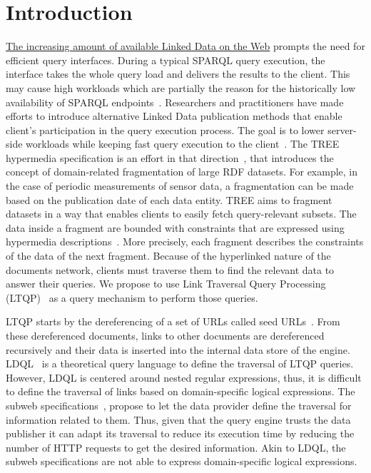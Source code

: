 \section{Introduction}



\href{https://lod-cloud.net/#diagram}{The increasing amount of available Linked Data on the Web} prompts the need for efficient query interfaces.
During a typical SPARQL query execution, the interface takes the whole query load and delivers the results to the client.
This may cause high workloads which are partially the reason for the historically low availability of SPARQL endpoints~\cite{aranda2013}.
Researchers and practitioners have made efforts to introduce alternative Linked Data publication methods that enable client's participation in the query execution process.
The goal is to lower server-side workloads while keeping fast query execution to the client~\cite{Azzam2021}.
The TREE hypermedia specification is an effort in that direction~\cite{ColpaertMaterializedTREE, lancker2021LDS}, that introduces the concept of domain-related fragmentation of large RDF datasets.
For example, in the case of periodic measurements of sensor data, a fragmentation can be made based on the publication date of each data entity.
TREE aims to fragment datasets in a way that enables clients to easily fetch query-relevant subsets.
The data inside a fragment are bounded with constraints that are expressed using hypermedia descriptions~\cite{thomasFieldingPhdThesis}.
More precisely, each fragment describes the constraints of the data of the next fragment.
Because of the hyperlinked nature of the documents network, clients must traverse them to find the relevant data to answer their queries.
We propose to use Link Traversal Query Processing (LTQP)~\cite{Hartig2016} as a query mechanism to perform those queries.

LTQP starts by the dereferencing of a set of URLs called seed URLs~\cite{Hartig2016}.
From these dereferenced documents, links to other documents are dereferenced recursively and their data is inserted into the internal data store of the engine.
LDQL~\cite{hartig2016Ldql} is a theoretical query language to define the traversal of LTQP queries.
However, LDQL is centered around nested regular expressions, thus, it is difficult to define the traversal of links based on domain-specific logical expressions.
The subweb specifications~\cite{bogaerts_rulemlrr_2021}, propose to let the data provider define the traversal for information related to them.
Thus, given that the query engine trusts the data publisher it can adapt its traversal to reduce its execution time by reducing the number of HTTP requests to get the desired information.
Akin to LDQL, the subweb specifications are not able to express domain-specific logical expressions.

